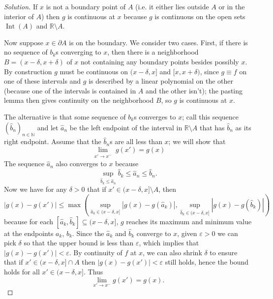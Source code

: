 \documentclass[10pt]{article}
\providecommand{\eps}{\varepsilon}
\providecommand{\NN}{\mathbb N}
\providecommand{\RR}{\mathbb R}
\newenvironment{soln}{\begin{proof}[Solution]}{\end{proof}}
\providecommand{\abs}[1]{\left|#1\right|}
\begin{document}
\begin{soln}
    If $x$ is not a boundary point of $A$ (i.e. it either lies outside $A$
    or in the interior of $A$) then $g$ is continuous at $x$ because
    $g$ is continuous on the open sets $\operatorname{Int}(A)$ and $\RR\setminus A$.

    Now suppose $x\in \partial A$ is on the boundary. We consider two cases.
    First, if there is no sequence of $b_k$s converging to $x$,
    then there is a neighborhood $B = (x-\delta,x+\delta)$
    of $x$ not containing any boundary points besides possibly $x$.
    By construction $g$ must be continuous on $(x-\delta, x]$ and $[x,x+\delta)$,
    since $g\equiv f$ on one of these intervals and $g$ is described by
    a linear polynomial on the other (because one of the intervals is contained in $A$
    and the other isn't); the pasting lemma then gives continuity
    on the neighborhood $B$, so $g$ is continuous at $x$.

    The alternative is that some sequence of $b_k$s converges to $x$;
    call this sequence $(\widehat b_n)_{n\in\NN}$
    and let $\widehat a_n$ be the left endpoint of the interval
    in $\RR\setminus A$ that has $\widehat b_n$ as its right endpoint.
    Assume that the $\widehat b_n$s are all less than $x$; we will show that
    \begin{equation*}
	\lim_{\substack{x'\to x^-}} g(x') = g(x)
    \end{equation*}
    The sequence $\widehat a_n$ also converges to $x$ because
    \begin{equation*}
	\sup_{\widehat b_k \le \widehat a_n} \widehat b_k
	\le \widehat a_n \le \widehat b_n.
    \end{equation*}
    Now we have for any $\delta>0$ that if $x'\in(x-\delta,x]\setminus A$, then
    \begin{equation*}
	\abs{g(x)-g(x')}\le
	\max\left(\sup_{\widehat a_k\in (x-\delta,x]} \abs{g(x) - g(\widehat a_k)},
	\sup_{\widehat b_k\in (x-\delta,x]} \abs{g(x)-g(\widehat b_k)}\right)
    \end{equation*}
    because for each $[\widehat a_k,\widehat b_k]\subseteq (x-\delta,x]$,
    $g$ reaches its maximum and minimum value at the endpoints $a_k$, $b_k$.
    Since the $\widehat a_k$ and $\widehat b_k$ converge to $x$,
    given $\eps>0$ we can pick $\delta$ so that the upper bound is
    less than $\eps$, which implies that $\abs{g(x)-g(x')} < \eps$.
    By continuity of $f$ at $x$, we can also shrink $\delta$ to ensure that
    if $x'\in (x-\delta,x]\cap A$ then $\abs{g(x)-g(x')} < \eps$
    still holds, hence the bound holds for all $x'\in (x-\delta,x]$. Thus
    \begin{equation*}
	\lim_{x'\to x^-} g(x') = g(x).
    \end{equation*}


\end{soln}
\end{document}
